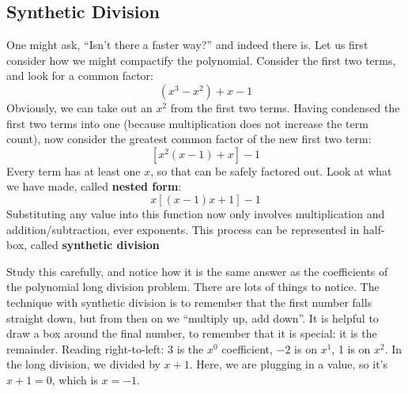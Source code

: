 \subsection{Synthetic Division}
One might ask, ``Isn't there a faster way?'' and indeed there is.  Let us first consider
how we might compactify the polynomial.  Consider the first two terms, and look for
a common factor:
$$
(x^3-x^2)+x-1
$$
Obviously, we can take out an $x^2$ from the first two terms.  Having condensed the
first two terms into one (because multiplication does not increase the term count),
now consider the greatest common factor of the new first two term:
$$
\left[x^2(x-1)+x\right]-1
$$
Every term has at least one $x$, so that can be safely factored out.  Look at what we have made,
called \textbf{nested form}:
$$
x\left[(x-1)x+1\right]-1
$$
Substituting any value into this function now only involves multiplication and addition/subtraction,
ever exponents.  This process can be represented in half-box, called \textbf{synthetic division}


Study this carefully, and notice how it is the same answer as the coefficients of the polynomial
long division problem.  There are lots of things to notice.  The technique with synthetic division is
to remember that the first number falls straight down, but from then on we  ``multiply up, add down''.  
It is helpful to draw a box around the final number, to remember that it is special: it is the remainder.  
Reading right-to-left: 3 is the $x^0$ coefficient, $-2$ is on $x^1$, 1 is on $x^2$.  
In the long division, we divided by $x + 1$.  Here, we are plugging in a value, so it's $x + 1 = 0$, 
which is $x=-1$. 

